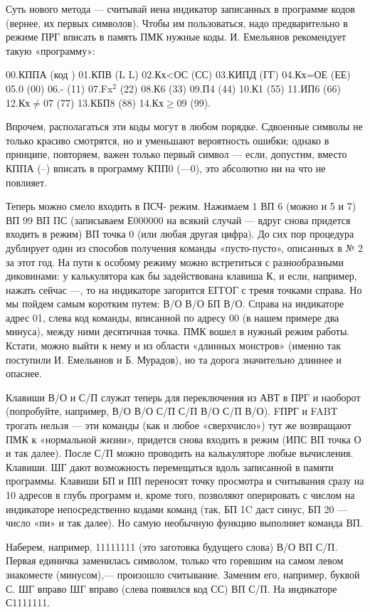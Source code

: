 \documentclass[11pt,a4paper,oneside]{article}
\begin{document}
Суть нового метода — считывай иена индикатор записанных в программе кодов (вернее, их первых символов). Чтобы им пользоваться, надо предварительно в режиме ПРГ вписать в память ПМК нужные коды. И. Емельянов рекомендует такую «программу»: 

00.КППА (код	) 01.КПВ (L L) 02.Кх<ОС (СС) 03.КИПД (ГГ) 04.Кх=ОЕ (ЕЕ) 05.0 (00) 06.- (11) 07.Fx$^{2}$ (22) 08.К6 (33) 09.П4 (44) 10.К1 (55) 11.ИП6 (66) 12.Кх$\neq$07 (77) 13.КБП8 (88) 14.Кх$\geq$09 (99). 

Впрочем, располагаться эти коды могут в любом порядке. Сдвоенные символы не только красиво смотрятся, но и уменьшают вероятность ошибки; однако в принципе, повторяем, важен только первый символ — если, допустим, вместо КППА (--) вписать в программу КПП0 (—0), это абсолютно ни на что не повлияет.

Теперь можно смело входить в ПСЧ- режим. Нажимаем 1 ВП 6 (можно и 5 и 7) ВП 99 ВП ПС (записываем Е000000 на всякий случай — вдруг снова придется входить в режим) ВП точка 0 (или любая другая цифра). До сих пор процедура дублирует один из способов получения команды «пусто-пусто», описанных в № 2 за этот год. На пути к особому режиму можно встретиться с разнообразными диковинами: у калькулятора как бы задействована клавиша К, и если, например, нажать сейчас —, то на индикаторе загорится ЕГГОГ с тремя точками справа. Но мы пойдем самым коротким путем: В/О В/О БП В/О. Справа на индикаторе адрес 01, слева код команды, вписанной по адресу 00 (в нашем примере два минуса), между ними десятичная точка. ПМК вошел в нужный режим работы. Кстати, можно выйти к нему и из области «длинных монстров» (именно так поступили И. Емельянов и Б. Мурадов), но та дорога значительно длиннее и опаснее.

Клавиши В/О и С/П служат теперь для переключения из АВТ в ПРГ и наоборот (попробуйте, например, В/О В/О С/П С/П В/О С/П В/О). FПРГ и FABT трогать нельзя — эти команды (как и любое «сверхчисло») тут же возвращают ПМК к «нормальной жизни», придется снова входить в режим (ИПС ВП точка О и так далее). После С/П можно проводить на калькуляторе любые вычисления. Клавиши. ШГ дают возможность перемещаться вдоль записанной в памяти программы. Клавиши БП и ПП переносят точку просмотра и считывания сразу на 10 адресов в глубь программ и, кроме того, позволяют оперировать с числом на индикаторе непосредственно кодами команд (так, БП 1C даст синус, БП 20 — число «пи» и так далее). Но самую необычную функцию выполняет команда ВП.

Наберем, например, 11111111 (это заготовка будущего слова) В/О ВП С/П. Первая единичка заменилась символом, только что горевшим на самом левом знакоместе (минусом),— произошло считывание. Заменим его, например, буквой С. ШГ вправо ШГ вправо (слева появился код СС) ВП С/П. На индикаторе С1111111.
\end{document}

